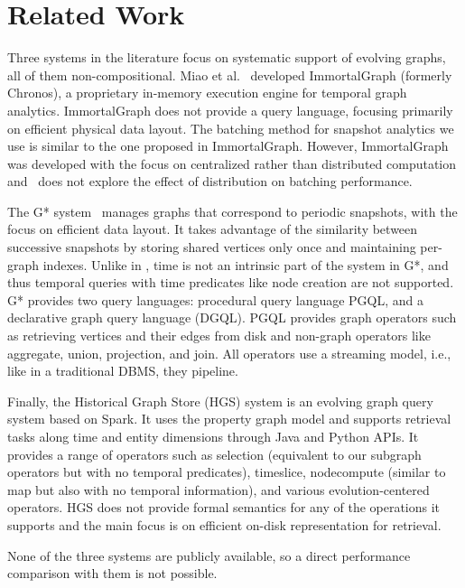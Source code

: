 \section{Related Work}
\label{sec:related}

Three systems in the literature focus on systematic support of
evolving graphs, all of them non-compositional.  Miao et
al.~\cite{Miao2015} developed ImmortalGraph (formerly Chronos), a
proprietary in-memory execution engine for temporal graph analytics.
ImmortalGraph does not provide a query language, focusing primarily on
efficient physical data layout.  The batching method for snapshot
analytics we use is similar to the one proposed in ImmortalGraph.
However, ImmortalGraph was developed with the focus on centralized
rather than distributed computation and~\cite{Miao2015} does not
explore the effect of distribution on batching performance.

The G* system~\cite{Labouseur2015} manages graphs that correspond to
periodic snapshots, with the focus on efficient data layout.  It takes
advantage of the similarity between successive snapshots by storing
shared vertices only once and maintaining per-graph indexes.  Unlike
in \tga, time is not an intrinsic part of the system in G*, and thus
temporal queries with time predicates like node creation are not
supported.  G* provides two query languages: procedural query language
PGQL, and a declarative graph query language (DGQL). PGQL provides
graph operators such as retrieving vertices and their edges from disk
and non-graph operators like aggregate, union, projection, and join.
All operators use a streaming model, i.e., like in a traditional DBMS,
they pipeline.

Finally, the Historical Graph Store (HGS) system is an evolving graph
query system based on Spark.  It uses the property graph model and
supports retrieval tasks along time and entity dimensions through Java
and Python APIs.  It provides a range of operators such as selection
(equivalent to our subgraph operators but with no temporal
predicates), timeslice, nodecompute (similar to map but also with no
temporal information), and various evolution-centered operators.  HGS
does not provide formal semantics for any of the operations it
supports and the main focus is on efficient on-disk representation for
retrieval.

None of the three systems are publicly available, so a direct
performance comparison with them is not possible.

